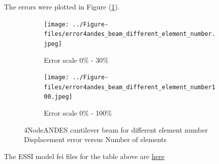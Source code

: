 \documentclass[fleqn,11pt]{article}
\begin{document}
The errors were plotted in Figure (\ref{fig error 4NodeANDES cantilever beam for different element number}).

\begin{figure}[H]
  \begin{subfigure}{0.5\textwidth}
    \centering
    \texttt{[image: ../Figure-files/error4andes\_beam\_different\_element\_number.jpeg]}
    \caption{Error scale 0\% - 30\%}
  \end{subfigure}
  \begin{subfigure}{0.5\textwidth}
    \centering
    \texttt{[image: ../Figure-files/error4andes\_beam\_different\_element\_number100.jpeg]}
    \caption{Error scale 0\% - 100\%}
  \end{subfigure}
  \captionsetup{justification=centering,margin=2cm}
  \caption{4NodeANDES cantilever beam for different element number\\
    Displacement error   versus   Number of elements}
  \label{fig error 4NodeANDES cantilever beam for different element number}
\end{figure}


The ESSI model fei files for the table above are \href{https://github.com/yuan-energy/ESSI_Verification/blob/master/4NodeANDES/cantilever_different_element_number/cantilever_different_element_number.tar.gz?raw=true}{here}





\end{document}

